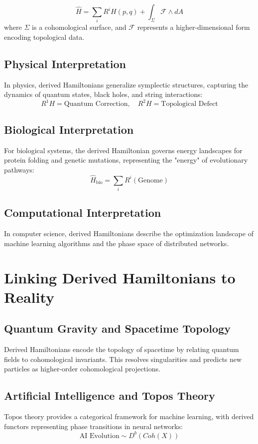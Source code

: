 \documentclass{article}
\begin{document}
\[
\hat{H} = \sum_i R^i H(p, q) + \int_\Sigma \mathcal{F} \wedge dA
\]
where \( \Sigma \) is a cohomological surface, and \( \mathcal{F} \) represents a higher-dimensional form encoding topological data.

\subsection{Physical Interpretation}
In physics, derived Hamiltonians generalize symplectic structures, capturing the dynamics of quantum states, black holes, and string interactions:
\[
R^1 H = \text{Quantum Correction}, \quad R^2 H = \text{Topological Defect}
\]

\subsection{Biological Interpretation}
For biological systems, the derived Hamiltonian governs energy landscapes for protein folding and genetic mutations, representing the "energy" of evolutionary pathways:
\[
\hat{H}_{\text{bio}} = \sum_i R^i(\text{Genome})
\]

\subsection{Computational Interpretation}
In computer science, derived Hamiltonians describe the optimization landscape of machine learning algorithms and the phase space of distributed networks.

\section{Linking Derived Hamiltonians to Reality}
\subsection{Quantum Gravity and Spacetime Topology}
Derived Hamiltonians encode the topology of spacetime by relating quantum fields to cohomological invariants. This resolves singularities and predicts new particles as higher-order cohomological projections.

\subsection{Artificial Intelligence and Topos Theory}
Topos theory provides a categorical framework for machine learning, with derived functors representing phase transitions in neural networks:
\[
\text{AI Evolution} \sim D^b(Coh(X))
\]
\end{document}
